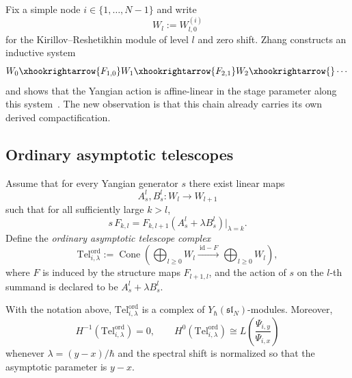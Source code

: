 Fix a simple node $i\in\{1,\dots,N-1\}$ and write
\begin{equation}
W_l:=W^{(i)}_{l,0}
\end{equation}
for the Kirillov--Reshetikhin module of level $l$ and zero shift.  Zhang
constructs an inductive system
\begin{equation}
W_0\xhookrightarrow{F_{1,0}}W_1\xhookrightarrow{F_{2,1}}W_2\xhookrightarrow{}\cdots
\end{equation}
and shows that the Yangian action is affine-linear in the stage parameter
along this system~\cite{Zhang24}.  The new observation is that this chain
already carries its own derived compactification.

\subsection{Ordinary asymptotic telescopes}

\begin{definition}
\label{def:ordinary-asymptotic-telescope}
Assume that for every Yangian generator $s$ there exist linear maps
\begin{equation}
A_s^l,B_s^l:W_l\longrightarrow W_{l+1}
\end{equation}
such that for all sufficiently large $k>l$,
\begin{equation}
\label{eq:ordinary-asymptotic-stage-action}
s\,F_{k,l}=F_{k,l+1}(A_s^l+\lambda B_s^l)\big|_{\lambda=k}.
\end{equation}
Define the \emph{ordinary asymptotic telescope complex}
\begin{equation}
\label{eq:ordinary-telescope-definition}
\mathrm{Tel}^{\mathrm{ord}}_{i,\lambda}
:=
\operatorname{Cone}\!\left(
\bigoplus_{l\ge 0}W_l
\xrightarrow{\ \mathrm{id}-F\ }
\bigoplus_{l\ge 0}W_l
\right),
\end{equation}
where $F$ is induced by the structure maps $F_{l+1,l}$, and the action of
$s$ on the $l$-th summand is declared to be $A_s^l+\lambda B_s^l$.
\end{definition}

\begin{theorem}
\ClaimStatusProvedHere
\label{thm:derived-realization-ordinary-asymptotic}
With the notation above, $\mathrm{Tel}^{\mathrm{ord}}_{i,\lambda}$ is a
complex of $Y_\hbar(\mathfrak{sl}_N)$-modules.  Moreover,
\begin{equation}
H^{-1}(\mathrm{Tel}^{\mathrm{ord}}_{i,\lambda})=0,
\qquad
H^0(\mathrm{Tel}^{\mathrm{ord}}_{i,\lambda})
\cong
L\!\left(\frac{\Psi_{i,y}}{\Psi_{i,x}}\right)
\end{equation}
whenever $\lambda=(y-x)/\hbar$ and the spectral shift is normalized so
that the asymptotic parameter is $y-x$.
\end{theorem}

